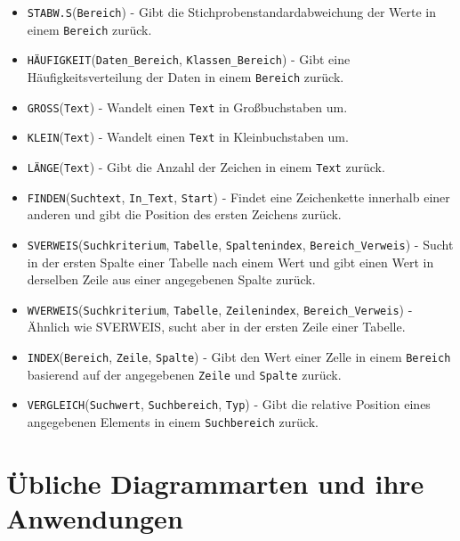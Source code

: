 \documentclass[11pt, oneside]{book}
\begin{document}
\begin{itemize}
    \item \texttt{STABW.S}(\texttt{Bereich}) - Gibt die Stichprobenstandardabweichung der Werte in einem \texttt{Bereich} zurück.
    
    \item \texttt{HÄUFIGKEIT}(\texttt{Daten\_Bereich}, \texttt{Klassen\_Bereich}) - Gibt eine Häufigkeitsverteilung der Daten in einem \texttt{Bereich} zurück.
    
    \item \texttt{GROSS}(\texttt{Text}) - Wandelt einen \texttt{Text} in Großbuchstaben um.
    
    \item \texttt{KLEIN}(\texttt{Text}) - Wandelt einen \texttt{Text} in Kleinbuchstaben um.
    
    \item \texttt{LÄNGE}(\texttt{Text}) - Gibt die Anzahl der Zeichen in einem \texttt{Text} zurück.
    
    \item \texttt{FINDEN}(\texttt{Suchtext}, \texttt{In\_Text}, \texttt{Start}) - Findet eine Zeichenkette innerhalb einer anderen und gibt die Position des ersten Zeichens zurück.
    
    \item \texttt{SVERWEIS}(\texttt{Suchkriterium}, \texttt{Tabelle}, \texttt{Spaltenindex}, \texttt{Bereich\_Verweis}) - Sucht in der ersten Spalte einer Tabelle nach einem Wert und gibt einen Wert in derselben Zeile aus einer angegebenen Spalte zurück.
    
    \item \texttt{WVERWEIS}(\texttt{Suchkriterium}, \texttt{Tabelle}, \texttt{Zeilenindex}, \texttt{Bereich\_Verweis}) - Ähnlich wie SVERWEIS, sucht aber in der ersten Zeile einer Tabelle.
    
    \item \texttt{INDEX}(\texttt{Bereich}, \texttt{Zeile}, \texttt{Spalte}) - Gibt den Wert einer Zelle in einem \texttt{Bereich} basierend auf der angegebenen \texttt{Zeile} und \texttt{Spalte} zurück.
    
    \item \texttt{VERGLEICH}(\texttt{Suchwert}, \texttt{Suchbereich}, \texttt{Typ}) - Gibt die relative Position eines angegebenen Elements in einem \texttt{Suchbereich} zurück.
\end{itemize}

\newpage
\section{Übliche Diagrammarten und ihre Anwendungen}
\end{document}
